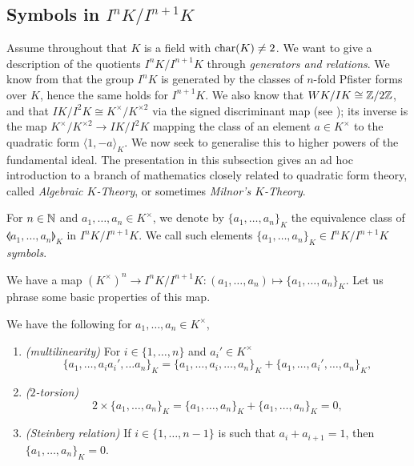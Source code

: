 \documentclass[12pt, leqno, british]{amsart}
\begin{document}
\subsection{Symbols in $I^nK/I^{n+1}K$}
Assume throughout that $K$ is a field with $\operatorname{char}(K) \neq 2$.
We want to give a description of the quotients $I^nK/I^{n+1}K$ through \emph{generators and relations}.
We know from  that the group $I^nK$ is generated by the classes of $n$-fold Pfister forms over $K$, hence the same holds for $I^{n+1}K$.
We also know that $WK/IK \cong \mathbb Z/2\mathbb Z$, and that $IK/I^2K \cong K^\times/K^{\times 2}$ via the signed discriminant map (see ); its inverse is the map $K^\times/K^{\times 2} \to IK/I^2K$ mapping the class of an element $a \in K^\times$ to the quadratic form $\langle 1, -a \rangle_K$.
We now seek to generalise this to higher powers of the fundamental ideal.
The presentation in this subsection gives an ad hoc introduction to a branch of mathematics closely related to quadratic form theory, called \emph{Algebraic $K$-Theory}, or sometimes \emph{Milnor's $K$-Theory}.
\begin{defi}
For $n \in \mathbb N$ and $a_1, \ldots, a_n \in K^\times$, we denote by $\lbrace a_1, \ldots, a_n \rbrace_K$ the equivalence class of $\llangle a_1, \ldots, a_n \rrangle_K$ in $I^nK/I^{n+1}K$.
We call such elements $\lbrace a_1, \ldots, a_n \rbrace_K \in I^nK/I^{n+1}K$ \emph{symbols}.
\end{defi}
We have a map $(K^\times)^n \to I^nK/I^{n+1}K : (a_1, \ldots, a_n) \mapsto \lbrace a_1, \ldots, a_n \rbrace_K$.
Let us phrase some basic properties of this map.
\begin{prop}\label{P:K-theory-axioms}
We have the following for $a_1, \ldots, a_n \in K^\times$,
\begin{enumerate}
\item\label{it:multilinearity} \textit{(multilinearity)} For $i \in \lbrace 1, \ldots, n \rbrace$ and $a_i' \in K^\times$ $$ \lbrace a_1, \ldots, a_{i}a_i', \ldots a_n \rbrace_K = \lbrace a_1, \ldots, a_i, \ldots, a_n \rbrace_K + \lbrace a_1, \ldots, a_i', \ldots, a_n \rbrace_K, $$
\item\label{it:2-torsion} \textit{($2$-torsion)}
$$ 2\times \lbrace a_1,\ldots, a_n \rbrace_K = \lbrace a_1,\ldots, a_n \rbrace_K + \lbrace a_1,\ldots, a_n \rbrace_K = 0,$$
\item\label{it:Steinberg} \textit{(Steinberg relation)} If $i \in \lbrace 1, \ldots, n-1 \rbrace$ is such that $a_i + a_{i+1} = 1$, then $\lbrace a_1, \ldots, a_n \rbrace_K = 0$.
\end{enumerate}
\end{prop}
\end{document}
